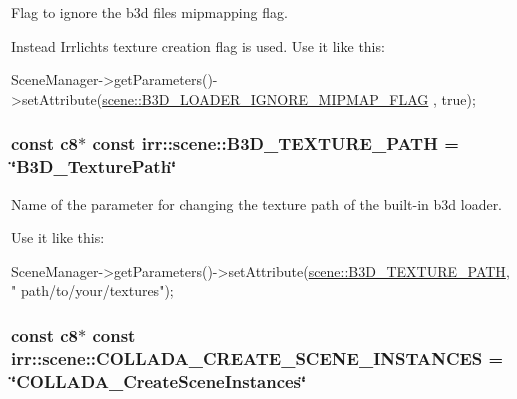 Flag to ignore the b3d file\textquotesingle{}s mipmapping flag. 

Instead Irrlicht\textquotesingle{}s texture creation flag is used. Use it like this\+: 
\begin{DoxyCode}
SceneManager->getParameters()->setAttribute(\hyperlink{namespaceirr_1_1scene_a0a190773ebdbed9f134b17d496fc526a}{scene::B3D\_LOADER\_IGNORE\_MIPMAP\_FLAG}
      , \textcolor{keyword}{true});
\end{DoxyCode}
\subsubsection[{\texorpdfstring{B3\+D\+\_\+\+T\+E\+X\+T\+U\+R\+E\+\_\+\+P\+A\+TH}{B3D\_TEXTURE\_PATH}}]{\setlength{\rightskip}{0pt plus 5cm}const {\bf c8}$\ast$ const irr\+::scene\+::\+B3\+D\+\_\+\+T\+E\+X\+T\+U\+R\+E\+\_\+\+P\+A\+TH = \char`\"{}B3\+D\+\_\+\+Texture\+Path\char`\"{}}\hypertarget{namespaceirr_1_1scene_acaad1f28c235751815637948cc845c15}{}\label{namespaceirr_1_1scene_acaad1f28c235751815637948cc845c15}


Name of the parameter for changing the texture path of the built-\/in b3d loader. 

Use it like this\+: 
\begin{DoxyCode}
SceneManager->getParameters()->setAttribute(\hyperlink{namespaceirr_1_1scene_acaad1f28c235751815637948cc845c15}{scene::B3D\_TEXTURE\_PATH}, \textcolor{stringliteral}{"
      path/to/your/textures"});
\end{DoxyCode}
\subsubsection[{\texorpdfstring{C\+O\+L\+L\+A\+D\+A\+\_\+\+C\+R\+E\+A\+T\+E\+\_\+\+S\+C\+E\+N\+E\+\_\+\+I\+N\+S\+T\+A\+N\+C\+ES}{COLLADA\_CREATE\_SCENE\_INSTANCES}}]{\setlength{\rightskip}{0pt plus 5cm}const {\bf c8}$\ast$ const irr\+::scene\+::\+C\+O\+L\+L\+A\+D\+A\+\_\+\+C\+R\+E\+A\+T\+E\+\_\+\+S\+C\+E\+N\+E\+\_\+\+I\+N\+S\+T\+A\+N\+C\+ES = \char`\"{}C\+O\+L\+L\+A\+D\+A\+\_\+\+Create\+Scene\+Instances\char`\"{}}\hypertarget{namespaceirr_1_1scene_a157681b3ef101a801ce278e6f21de946}{}\label{namespaceirr_1_1scene_a157681b3ef101a801ce278e6f21de946}


